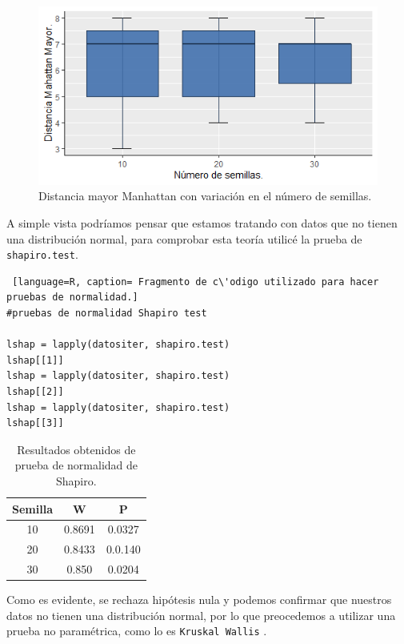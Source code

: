 \documentclass{article}
\begin{document}
\begin{figure}[htbp] %
    \centering
    \includegraphics[width=150mm]{Rplot.png} %
    \caption{Distancia mayor Manhattan con variaci\'on en el n\'umero de semillas.}
    \label{Figura 1}
\end{figure}

A simple vista podr\'iamos pensar que estamos tratando con datos que no tienen una distribuci\'on normal, para comprobar esta teor\'ia utilic\'e la prueba de \texttt{shapiro.test}.

\begin{lstlisting} [language=R, caption= Fragmento de c\'odigo utilizado para hacer pruebas de normalidad.]
#pruebas de normalidad Shapiro test

lshap = lapply(datositer, shapiro.test)
lshap[[1]]
lshap = lapply(datositer, shapiro.test)
lshap[[2]]
lshap = lapply(datositer, shapiro.test)
lshap[[3]]
\end{lstlisting}

\begin{table}[ht]
    \centering
    \caption{Resultados obtenidos de prueba de normalidad de Shapiro.} 
    \begin{tabular}{|c|c|c|}
    \hline
    Semilla & W & P  \\
    \hline
    10 & 0.8691 & 0.0327 \\
    \hline
    20 & 0.8433 & 0.0.140 \\
    \hline
    30 & 0.850 & 0.0204\\
    \hline
\end{tabular}
    \label{cuadro 2}
\end{table}
\newpage

Como es evidente, se rechaza hip\'otesis nula y podemos confirmar que nuestros datos no tienen una distribución normal, por lo que preocedemos a utilizar una prueba no param\'etrica, como lo es \texttt{Kruskal Wallis} \cite{SeleccionPruebas, InterpretacionKruskalWallis}.
\end{document}
